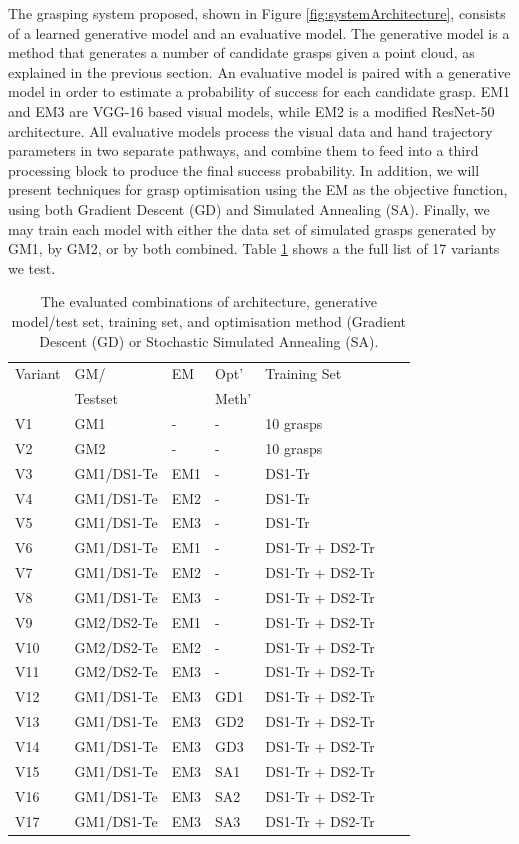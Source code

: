 The grasping system proposed, shown in Figure \ref{fig:systemArchitecture}, consists of a learned generative model and an evaluative model. The generative model is a method that generates a number of candidate grasps given a point cloud, as explained in the previous section. An evaluative model is paired with a generative model in order to estimate a probability of success for each candidate grasp. EM1 and EM3 are VGG-16 based visual models, while EM2 is a modified ResNet-50 architecture. All evaluative models process the visual data and hand trajectory parameters in two separate pathways, and combine them to feed into a third processing block to produce the final success probability. In addition, we will present techniques for grasp optimisation using the EM as the objective function, using both Gradient Descent (GD) and Simulated Annealing (SA). Finally, we may train each model with either the data set of simulated grasps generated by GM1, by GM2, or by both combined. Table \ref{table:GEBreakdown} shows a the full list of 17 variants we test.

\begin{table}[]
\centering
\begin{tabular}{|l|l|l|l|l|l|l|}
\hline
Variant & GM/  & EM & Opt'  & Training Set \\ 
 & Testset & & Meth' & \\ \hline
V1 & GM1    & - & - & 10 grasps  \\ \hline
V2 & GM2    & - & - & 10 grasps  \\ \hline
V3 & GM1/DS1-Te & EM1 & - & DS1-Tr \\ \hline
V4 & GM1/DS1-Te & EM2 & - & DS1-Tr \\ \hline
V5 & GM1/DS1-Te & EM3 & - & DS1-Tr  \\ \hline
V6 & GM1/DS1-Te & EM1 & - & DS1-Tr + DS2-Tr \\ \hline
V7 & GM1/DS1-Te & EM2 & - & DS1-Tr + DS2-Tr \\ \hline
V8 & GM1/DS1-Te & EM3 & - & DS1-Tr + DS2-Tr \\ \hline
V9 & GM2/DS2-Te & EM1 & - & DS1-Tr + DS2-Tr \\ \hline
V10 & GM2/DS2-Te & EM2 & - & DS1-Tr + DS2-Tr \\ \hline
V11 & GM2/DS2-Te & EM3 & - & DS1-Tr + DS2-Tr \\ \hline
V12 & GM1/DS1-Te & EM3 & GD1 & DS1-Tr + DS2-Tr \\ \hline
V13 & GM1/DS1-Te & EM3 & GD2 & DS1-Tr + DS2-Tr \\ \hline
V14 & GM1/DS1-Te & EM3 & GD3 & DS1-Tr + DS2-Tr \\ \hline
V15 & GM1/DS1-Te & EM3 & SA1 & DS1-Tr + DS2-Tr \\ \hline
V16 & GM1/DS1-Te & EM3 & SA2 & DS1-Tr + DS2-Tr \\ \hline
V17 & GM1/DS1-Te & EM3 & SA3 & DS1-Tr + DS2-Tr \\ \hline
\end{tabular}
\caption{The evaluated combinations of architecture, generative model/test set, training set, and optimisation method (Gradient Descent (GD) or Stochastic Simulated Annealing (SA).}
\label{table:GEBreakdown}
\end{table}

